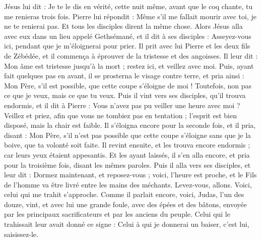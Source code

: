 \begin{multicols}{2}
Jésus lui dit : Je te le dis en vérité, cette nuit même, avant que le coq chante, tu me renieras trois fois.
Pierre lui répondit : Même s’il me fallait mourir avec toi, je ne te renierai pas. Et tous les disciples dirent la même chose.
Alors Jésus alla avec eux dans un lieu appelé Gethsémané, et il dit à ses disciples : Asseyez-vous ici, pendant que je m’éloignerai pour prier.
Il prit avec lui Pierre et les deux fils de Zébédée, et il commença à éprouver de la tristesse et des angoisses.
Il leur dit : Mon âme est tristesse jusqu’à la mort ; restez ici, et veillez avec moi.
Puis, ayant fait quelques pas en avant, il se prosterna le visage contre terre, et pria ainsi : Mon Père, s'il est possible, que cette coupe s’éloigne de moi ! Toutefois, non pas ce que je veux, mais ce que tu veux.
Puis il vint vers ses disciples, qu’il trouva endormis, et il dit à Pierre : Vous n’avez pas pu veiller une heure avec moi ?
Veillez et priez, afin que vous ne tombiez pas en tentation ; l'esprit est bien disposé, mais la chair est faible.
Il s’éloigna encore pour la seconde fois, et il pria, disant : Mon Père, s'il n'est pas possible que cette coupe s’éloigne sans que je la boive, que ta volonté soit faite.
Il revint ensuite, et les trouva encore endormis ; car leurs yeux étaient appesantis.
Et les ayant laissés, il s'en alla encore, et pria pour la troisième fois, disant les mêmes paroles.
Puis il alla vers ses disciples, et leur dit : Dormez maintenant, et reposez-vous ; voici, l'heure est proche, et le Fils de l'homme va être livré entre les mains des méchants.
Levez-vous, allons. Voici, celui qui me trahit s'approche.
Comme il parlait encore, voici, Judas, l'un des douze, vint, et avec lui une grande foule, avec des épées et des bâtons, envoyée par les principaux sacrificateurs et par les anciens du peuple.
Celui qui le trahissait leur avait donné ce signe : Celui à qui je donnerai un baiser, c'est lui, saisissez-le.

\end{multicols}
